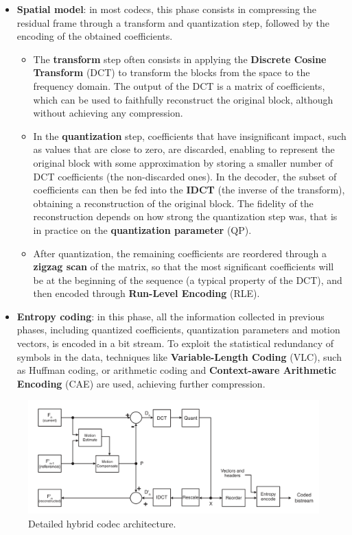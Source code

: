 \begin{itemize}
    \item \textbf{Spatial model}: in most codecs, this phase consists in compressing the residual frame through a transform and quantization step, followed by the encoding of the obtained coefficients.
        \begin{itemize}
            \item The \textbf{transform} step often consists in applying the \textbf{Discrete Cosine Transform} (DCT) to transform the blocks from the space to the frequency domain. The output of the DCT is a matrix of coefficients, which can be used to faithfully reconstruct the original block, although without achieving any compression.
            \item In the \textbf{quantization} step, coefficients that have insignificant impact, such as values that are close to zero, are discarded, enabling to represent the original block with some approximation by storing a smaller number of DCT coefficients (the non-discarded ones). In the decoder, the subset of coefficients can then be fed into the \textbf{IDCT} (the inverse of the transform), obtaining a reconstruction of the original block. The fidelity of the reconstruction depends on how strong the quantization step was, that is in practice on the \textbf{quantization parameter} (QP).
            \item After quantization, the remaining coefficients are reordered through a \textbf{zigzag scan} of the matrix, so that the most significant coefficients will be at the beginning of the sequence (a typical property of the DCT), and then encoded through \textbf{Run-Level Encoding} (RLE).
        \end{itemize}
     
    \item \textbf{Entropy coding}: in this phase, all the information collected in previous phases, including quantized coefficients, quantization parameters and motion vectors, is encoded in a bit stream. To exploit the statistical redundancy of symbols in the data, techniques like \textbf{Variable-Length Coding} (VLC), such as Huffman coding, or arithmetic coding and \textbf{Context-aware Arithmetic Encoding} (CAE) are used, achieving further compression.
\end{itemize}

\begin{figure}[hb]
	\centering
	
	\includegraphics[width=\textwidth]{res/hybrid_codec_detailed.png}
	
	\caption{Detailed hybrid codec architecture.\cite{h264}}
	\label{fig:codec_detailed}
\end{figure}

